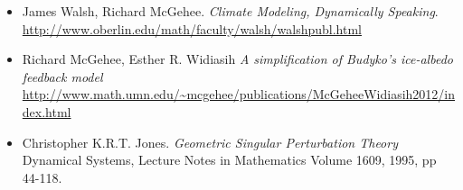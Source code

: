 \begin{itemize}
\item James Walsh, Richard McGehee.  \emph{Climate Modeling, Dynamically Speaking}.  \\
\url{http://www.oberlin.edu/math/faculty/walsh/walshpubl.html}
\item Richard McGehee, Esther R. Widiasih \emph{A simplification of Budyko's ice-albedo feedback model} \\
\url{http://www.math.umn.edu/~mcgehee/publications/McGeheeWidiasih2012/index.html}
\item Christopher K.R.T. Jones. \emph{Geometric Singular Perturbation Theory} \\
Dynamical Systems, Lecture Notes in Mathematics Volume 1609, 1995, pp 44-118.
\end{itemize}